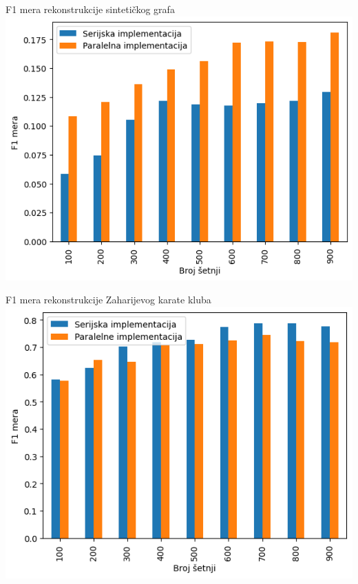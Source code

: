 \documentclass{beamer}
\begin{document}
\begin{frame}{F1 mera rekonstrukcije sintetičkog grafa}
    \centering
    \includegraphics[height=0.8\textheight]{./csv/4.10.png}
\end{frame}
    
\begin{frame}{F1 mera rekonstrukcije Zaharijevog karate kluba}
    \centering 
    \includegraphics[height=0.8\textheight]{./csv/4.4.png}
\end{frame}
\end{document}
